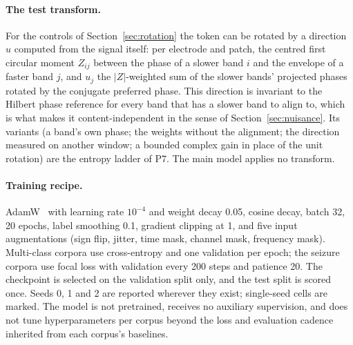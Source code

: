 \paragraph{The test transform.}
For the controls of Section~\ref{sec:rotation} the token can be rotated by a direction $u$ computed from the signal itself: per electrode and patch, the centred first circular moment $Z_{ij}$ between the phase of a slower band $i$ and the envelope of a faster band $j$, and $u_j$ the $|Z|$-weighted sum of the slower bands' projected phases rotated by the conjugate preferred phase. This direction is invariant to the Hilbert phase reference for every band that has a slower band to align to, which is what makes it content-independent in the sense of Section~\ref{sec:nuisance}. Its variants (a band's own phase; the weights without the alignment; the direction measured on another window; a bounded complex gain in place of the unit rotation) are the entropy ladder of P7. The main model applies no transform.

\paragraph{Training recipe.}
AdamW~\cite{loshchilov2019decoupled} with learning rate $10^{-4}$ and weight decay 0.05, cosine decay, batch 32, 20 epochs, label smoothing 0.1, gradient clipping at 1, and five input augmentations (sign flip, jitter, time mask, channel mask, frequency mask). Multi-class corpora use cross-entropy and one validation per epoch; the seizure corpora use focal loss with validation every 200 steps and patience 20. The checkpoint is selected on the validation split only, and the test split is scored once. Seeds 0, 1 and 2 are reported wherever they exist; single-seed cells are marked. The model is not pretrained, receives no auxiliary supervision, and does not tune hyperparameters per corpus beyond the loss and evaluation cadence inherited from each corpus's baselines.
